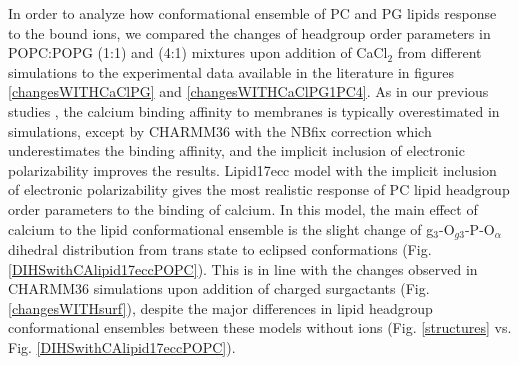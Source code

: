 \documentclass[aps,prl,superscriptaddress,twocolumn]{revtex4}
\begin{document}
In order to analyze how conformational ensemble of PC and PG lipids response to the
bound ions, we compared the changes of headgroup order parameters
in POPC:POPG (1:1) and (4:1) mixtures upon addition of CaCl$_2$ from different simulations
to the experimental data available in the literature \cite{borle85,macdonald87}
in figures \ref{changesWITHCaClPG} and \ref{changesWITHCaClPG1PC4}.
As in our previous studies \cite{catte16,melcr18,antila19,melcr20},  
the calcium binding affinity to membranes is typically overestimated in simulations,
except by CHARMM36 with the NBfix correction which underestimates the binding affinity,
and the implicit inclusion of electronic polarizability improves the results.
Lipid17ecc model with the implicit inclusion of electronic polarizability gives
the most realistic response of PC lipid headgroup order parameters to the binding of calcium.
In this model, the main effect of calcium to the lipid conformational ensemble is
the slight change of g$_3$-O$_{g3}$-P-O$_\alpha$ dihedral distribution from trans state
to eclipsed conformations (Fig. \ref{DIHSwithCAlipid17eccPOPC}).
This is in line with the changes observed in CHARMM36 simulations upon addition of charged surgactants (Fig. \ref{changesWITHsurf}),
despite the major differences in lipid headgroup conformational ensembles between
these models without ions (Fig. \ref{structures} vs. Fig. \ref{DIHSwithCAlipid17eccPOPC}).


\end{document}
